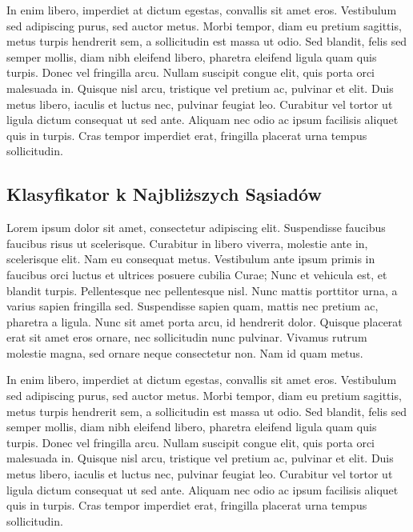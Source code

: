 	In enim libero, imperdiet at dictum egestas, convallis sit amet eros. Vestibulum sed adipiscing purus, sed auctor metus. Morbi tempor, diam eu pretium sagittis, metus turpis hendrerit sem, a sollicitudin est massa ut odio. Sed blandit, felis sed semper mollis, diam nibh eleifend libero, pharetra eleifend ligula quam quis turpis. Donec vel fringilla arcu. Nullam suscipit congue elit, quis porta orci malesuada in. Quisque nisl arcu, tristique vel pretium ac, pulvinar et elit. Duis metus libero, iaculis et luctus nec, pulvinar feugiat leo. Curabitur vel tortor ut ligula dictum consequat ut sed ante. Aliquam nec odio ac ipsum facilisis aliquet quis in turpis. Cras tempor imperdiet erat, fringilla placerat urna tempus sollicitudin.
	
	\subsection{Klasyfikator k Najbliższych Sąsiadów}
	Lorem ipsum dolor sit amet, consectetur adipiscing elit. Suspendisse faucibus faucibus risus ut scelerisque. Curabitur in libero viverra, molestie ante in, scelerisque elit. Nam eu consequat metus. Vestibulum ante ipsum primis in faucibus orci luctus et ultrices posuere cubilia Curae; Nunc et vehicula est, et blandit turpis. Pellentesque nec pellentesque nisl. Nunc mattis porttitor urna, a varius sapien fringilla sed. Suspendisse sapien quam, mattis nec pretium ac, pharetra a ligula. Nunc sit amet porta arcu, id hendrerit dolor. Quisque placerat erat sit amet eros ornare, nec sollicitudin nunc pulvinar. Vivamus rutrum molestie magna, sed ornare neque consectetur non. Nam id quam metus.

	In enim libero, imperdiet at dictum egestas, convallis sit amet eros. Vestibulum sed adipiscing purus, sed auctor metus. Morbi tempor, diam eu pretium sagittis, metus turpis hendrerit sem, a sollicitudin est massa ut odio. Sed blandit, felis sed semper mollis, diam nibh eleifend libero, pharetra eleifend ligula quam quis turpis. Donec vel fringilla arcu. Nullam suscipit congue elit, quis porta orci malesuada in. Quisque nisl arcu, tristique vel pretium ac, pulvinar et elit. Duis metus libero, iaculis et luctus nec, pulvinar feugiat leo. Curabitur vel tortor ut ligula dictum consequat ut sed ante. Aliquam nec odio ac ipsum facilisis aliquet quis in turpis. Cras tempor imperdiet erat, fringilla placerat urna tempus sollicitudin.

